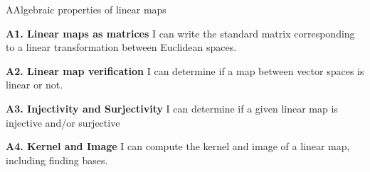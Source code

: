 
\begin{module}{A}{Algebraic properties of linear maps}

\begin{moduleStandards}
  \item \textbf{A1. Linear maps as matrices}
         I can write the standard matrix corresponding to a linear transformation between Euclidean spaces.
  \item \textbf{A2. Linear map verification}
        I can determine if a map between vector spaces is linear or not.
  \item \textbf{A3. Injectivity and Surjectivity}
        I can determine if a given linear map is injective and/or surjective
  \item \textbf{A4. Kernel and Image}
        I can compute the kernel and image of a linear map, including finding bases.
\end{moduleStandards}







\end{module}

